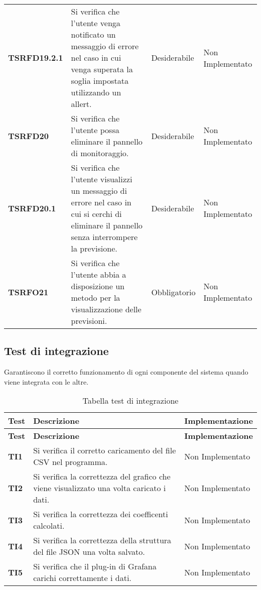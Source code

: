 \documentclass[../piano-di-qualifica.tex]{subfiles}
\begin{document}
\begin{longtable}[H]{>{\centering\bfseries}m{2.5cm} >{\centering}m{7.5cm} >{\centering}m{2.5cm} >{\centering\arraybackslash}m{3.5cm}}
  \textbf{TSRFD19.2.1} & Si verifica che l'utente venga notificato un messaggio di errore nel caso in cui venga superata la soglia impostata utilizzando un allert. & Desiderabile & Non Implementato \\
  \textbf{TSRFD20} & Si verifica che l'utente possa eliminare il pannello di monitoraggio. & Desiderabile & Non Implementato \\
  \textbf{TSRFD20.1} & Si verifica che l'utente visualizzi un messaggio di errore nel caso in cui si cerchi di eliminare il pannello senza interrompere la previsione. & Desiderabile & Non Implementato \\
  \textbf{TSRFO21} & Si verifica che l'utente abbia a disposizione un metodo per la visualizzazione delle previsioni. & Obbligatorio & Non Implementato \\

\end{longtable}

\subsection{Test di integrazione}
\label{sub:test_di_integrazione}
Garantiscono il corretto funzionamento di ogni componente del sistema quando viene integrata con le altre.

\renewcommand{\arraystretch}{2} %
\begin{longtable}[H]{>{\centering\bfseries}m{2.5cm} >{\centering}m{7.5cm} >{\centering\arraybackslash}m{3.5cm}}
  \caption{Tabella test di integrazione}%
  \label{tab:tabella_test_di_integrazione}                                                    \\
  \rowcolor{lightgray}
  {\textbf{Test}} & {\textbf{Descrizione}} & {\textbf{Implementazione}}  \\
  \endfirsthead%
  \rowcolor{lightgray}
  {\textbf{Test}} & {\textbf{Descrizione}} & {\textbf{Implementazione}}  \\
  \endhead%
  \rowcolor{white}
  \multicolumn{3}{c}{\textit{Continua alla pagina successiva}}
  \endfoot%
  \endlastfoot%
  \textbf{TI1} & Si verifica il corretto caricamento del file CSV nel programma. & Non Implementato \\
  \textbf{TI2} & Si verifica la correttezza del grafico che viene visualizzato una volta caricato i dati. & Non Implementato \\
  \textbf{TI3} & Si verifica la correttezza dei coefficenti calcolati. & Non Implementato \\
  \textbf{TI4} & Si verifica la correttezza della struttura del file JSON una volta salvato. & Non Implementato \\
  \textbf{TI5} & Si verifica che il plug-in di Grafana carichi correttamente i dati. & Non Implementato \\

\end{longtable}
\end{document}
